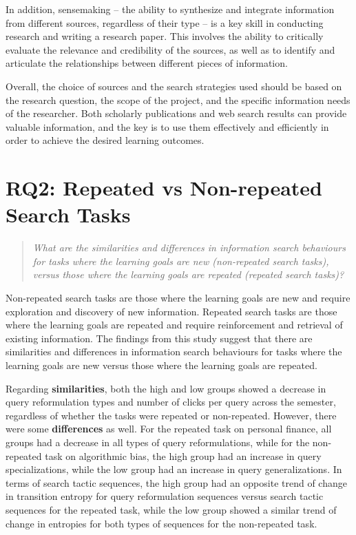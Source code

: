 \documentclass[letterpaper, nobind]{templates/ociamthesis}
\begin{document}
In addition, sensemaking -- the ability to synthesize and integrate information from different sources, regardless of their type -- is a key skill in conducting research and writing a research paper.
This involves the ability to critically evaluate the relevance and credibility of the sources, as well as to identify and articulate the relationships between different pieces of information.

Overall, the choice of sources and the search strategies used should be based on the research question, the scope of the project, and the specific information needs of the researcher. Both scholarly publications and web search results can provide valuable information, and the key is to use them effectively and efficiently in order to achieve the desired learning outcomes.

\hypertarget{rq2-repeated-vs-non-repeated-search-tasks}{%
\section{RQ2: Repeated vs Non-repeated Search Tasks}\label{rq2-repeated-vs-non-repeated-search-tasks}}

\begin{quote}
\emph{What are the similarities and differences in information search behaviours for tasks where the learning goals are new (non-repeated search tasks), versus those where the learning goals are repeated (repeated search tasks)?}
\end{quote}

Non-repeated search tasks are those where the learning goals are new and require exploration and discovery of new information.
Repeated search tasks are those where the learning goals are repeated and require reinforcement and retrieval of existing information.
The findings from this study suggest that there are similarities and differences in information search behaviours for tasks where the learning goals are new versus those where the learning goals are repeated.

Regarding \textbf{similarities}, both the high and low groups showed a decrease in query reformulation types and number of clicks per query across the semester, regardless of whether the tasks were repeated or non-repeated.
However, there were some \textbf{differences} as well.
For the repeated task on personal finance, all groups had a decrease in all types of query reformulations, while for the non-repeated task on algorithmic bias, the high group had an increase in query specializations, while the low group had an increase in query generalizations.
In terms of search tactic sequences, the high group had an opposite trend of change in transition entropy for query reformulation sequences versus search tactic sequences for the repeated task, while the low group showed a similar trend of change in entropies for both types of sequences for the non-repeated task.
\end{document}
